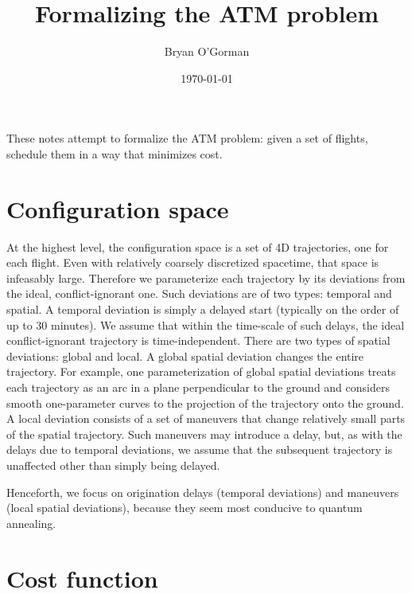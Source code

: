 \documentclass{article}
\title{Formalizing the ATM problem}
\author{Bryan O'Gorman}
\date{\today}
\begin{document}
\maketitle

These notes attempt to formalize the ATM problem: given a set of flights, schedule them in a way that minimizes cost.

\section{Configuration space}

At the highest level, the configuration space is a set of 4D trajectories, one for each flight.
Even with relatively coarsely discretized spacetime, that space is infeasably large.
Therefore we parameterize each trajectory by its deviations from the ideal, conflict-ignorant one.
Such deviations are of two types: temporal and spatial. 
A temporal deviation is simply a delayed start (typically on the order of up to 30 minutes). 
We assume that within the time-scale of such delays, the ideal conflict-ignorant trajectory is time-independent.
There are two types of spatial deviations: global and local.
A global spatial deviation changes the entire trajectory.
For example, one parameterization of global spatial deviations treats each trajectory as an arc in a plane perpendicular to the ground and considers smooth one-parameter curves to the projection of the trajectory onto the ground.
A local deviation consists of a set of maneuvers that change relatively small parts of the spatial trajectory.
Such maneuvers may introduce a delay, but, as with the delays due to temporal deviations, we assume that the subsequent trajectory is unaffected other than simply being delayed.

Henceforth, we focus on origination delays (temporal deviations) and maneuvers (local spatial deviations), because they seem most conducive to quantum annealing.

\section{Cost function}
\end{document}
